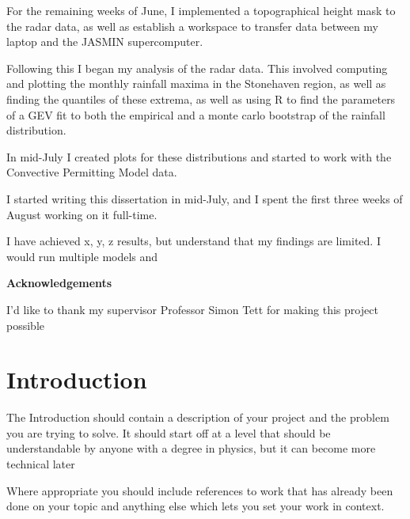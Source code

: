 \documentclass[12pt,a4paper]{report}
\begin{document}
For the remaining weeks of June, I implemented a topographical height mask
to the radar data, as well as establish a workspace to transfer data between
my laptop and the JASMIN supercomputer.

Following this I began my analysis of the radar data.
This involved computing and plotting the monthly rainfall maxima in
the Stonehaven region, as well as finding the quantiles of these extrema,
as well as using R to find the parameters of a GEV fit to both the empirical
and a monte carlo bootstrap of the rainfall distribution.

In mid-July I created plots for these distributions and started to work with the
Convective Permitting Model data.



I started writing this dissertation in mid-July, and I spent the first
three weeks of August working on it full-time.

I have achieved x, y, z results, but understand that my findings are limited.
I would run multiple models and


\newpage

\begin{center}
\textbf{Acknowledgements}
\end{center}

I'd like to thank my supervisor Professor Simon Tett for
making this project possible



\tableofcontents
\listoftables
\listoffigures


\chapter{Introduction}\label{ch:intro}
The Introduction should contain a description of your project and the
problem you are trying to solve. It should start off at a level that
should be understandable by anyone with a degree in physics, but it
can become more technical later

Where appropriate you should include references to work that has
already been done on your topic and anything else which lets you set
your work in context.
\end{document}

